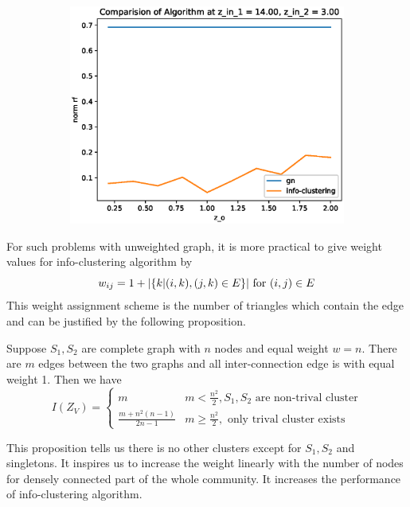 \documentclass{article}
\begin{document}
\begin{figure}
\begin{subfigure}{0.33\textwidth}
		\includegraphics[width=\textwidth]{pic/z_o.eps}
		\caption{}
	\end{subfigure}
	\caption{}\label{fig:cdr}	
\end{figure}

For such problems with unweighted graph, it is more practical to give weight values for info-clustering algorithm by 
\begin{equation}
    w_{ij} = 1 + \lvert\{k | (i,k),(j,k) \in E \}\rvert \textrm{ for } (i,j) \in E
\end{equation}
This weight assignment scheme is the number of triangles which contain the edge and can be justified by the following proposition.
\begin{proposition}
Suppose $S_1, S_2 $ are complete graph with $n$ nodes and equal weight $w=n$. There are $m$ edges between the two graphs and all inter-connection edge is with equal weight 1. Then we have
\begin{equation}
I(Z_V) = \begin{cases}
m & m <\frac{n^2}{2}, S_1,S_2 \textrm{ are non-trival cluster} \\
\frac{m+n^2(n-1)}{2n-1} & m\geq \frac{n^2}{2}, \textrm{ only trival cluster exists} 
\end{cases}
\end{equation}
\end{proposition}
This proposition tells us there is no other clusters except for $S_1, S_2$ and singletons. It inspires us to increase the weight linearly with the number of nodes for densely connected part of the whole community. It increases the performance of info-clustering algorithm.
\end{document}
